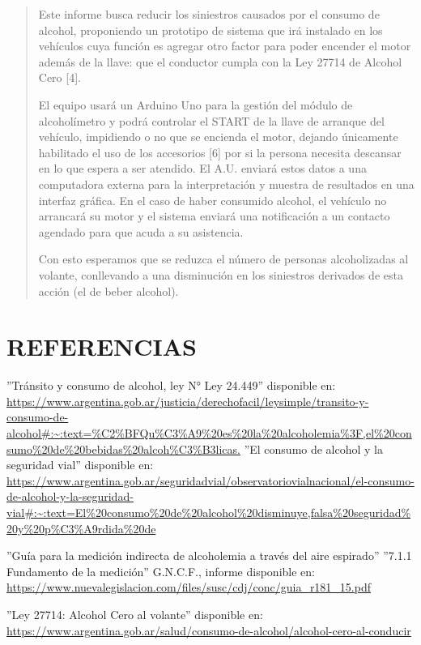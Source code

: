 \documentclass[a4paper,11pt]{article}
\begin{document}
\begin{multicols}{2}
\begin{quotation}
					Este informe busca reducir los siniestros causados por el consumo de alcohol, proponiendo un prototipo de sistema que irá instalado en los vehículos cuya función es agregar otro factor para poder encender el motor además de la llave: que el conductor cumpla con la Ley 27714 de Alcohol Cero [4].
				
					El equipo usará un Arduino Uno para la gestión del módulo de alcoholímetro y podrá controlar el START de la llave de arranque del vehículo, impidiendo o no que se encienda el motor, dejando únicamente habilitado el uso de los accesorios [6] por si la persona necesita descansar en lo que espera a ser atendido. El A.U. enviará estos datos a una computadora externa para la interpretación y muestra de resultados en una interfaz gráfica. En el caso de haber consumido alcohol, el vehículo no arrancará su motor y el sistema enviará una notificación a un contacto agendado para que acuda a su asistencia.
				
					Con esto esperamos que se reduzca el número de personas alcoholizadas al volante, conllevando a una disminución en los siniestros derivados de esta acción (el de beber alcohol).
			\end{quotation}
		
		\section{REFERENCIAS}
			\vspace{-1cm}
			\begin{thebibliography}{6}
				''Tránsito y consumo de alcohol, ley N° Ley 24.449'' disponible en: \url{https://www.argentina.gob.ar/justicia/derechofacil/leysimple/transito-y-consumo-de-alcohol#:~:text=%C2%BFQu%C3%A9%20es%20la%20alcoholemia%3F,el%20consumo%20de%20bebidas%20alcoh%C3%B3licas.}			
				''El consumo de alcohol y la seguridad vial'' disponible en: \url{https://www.argentina.gob.ar/seguridadvial/observatoriovialnacional/el-consumo-de-alcohol-y-la-seguridad-vial#:~:text=El%20consumo%20de%20alcohol%20disminuye,falsa%20seguridad%20y%20p%C3%A9rdida%20de}
				
				''Guía para la medición indirecta de alcoholemia a través del aire espirado'' ''7.1.1 Fundamento de la medición'' G.N.C.F., informe disponible en: \url{https://www.nuevalegislacion.com/files/susc/cdj/conc/guia_r181_15.pdf}
				
				''Ley 27714: Alcohol Cero al volante'' disponible en: \url{https://www.argentina.gob.ar/salud/consumo-de-alcohol/alcohol-cero-al-conducir}
				

\end{thebibliography}
\end{multicols}
\end{document}

